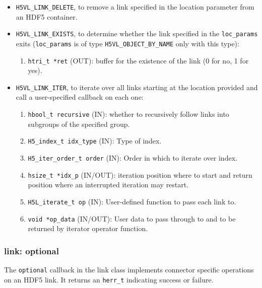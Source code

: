 \begin{itemize}
\item \texttt{H5VL\_LINK\_DELETE}, to remove a link specified in the location parameter from an HDF5 container.

\item \texttt{H5VL\_LINK\_EXISTS}, to determine whether the link specified
  in the \texttt{loc\_params} exits (\texttt{loc\_params} is of type \texttt{H5VL\_OBJECT\_BY\_NAME} only with this type):
  \begin{enumerate}
  \item \texttt{htri\_t *ret} (OUT): buffer for the existence of the link
    (0 for no, 1 for yes).
  \end{enumerate}

\item \texttt{H5VL\_LINK\_ITER}, to iterate over all links starting at the location provided and call a user-specified callback on each one:
  \begin{enumerate}
  \item \texttt{hbool\_t recursive} (IN): whether to recursively follow links into subgroups of the specified group.\\
  \item \texttt{H5\_index\_t idx\_type} (IN): Type of index.\\
  \item \texttt{H5\_iter\_order\_t order} (IN): Order in which to iterate over index.\\
  \item \texttt{hsize\_t *idx\_p} (IN/OUT):  iteration position where to start and return position where an interrupted iteration may restart.\\
  \item \texttt{H5L\_iterate\_t op} (IN): User-defined function to pass each link to. \\
  \item \texttt{void *op\_data} (IN/OUT): User data to pass through to and to be returned by iterator operator function. \\
  \end{enumerate}
\end{itemize}

\subsubsection{link: optional}
The \texttt{optional} callback in the link class implements connector specific operations on an HDF5 link. It returns an \texttt{herr\_t} indicating success or failure.\bigskip 

